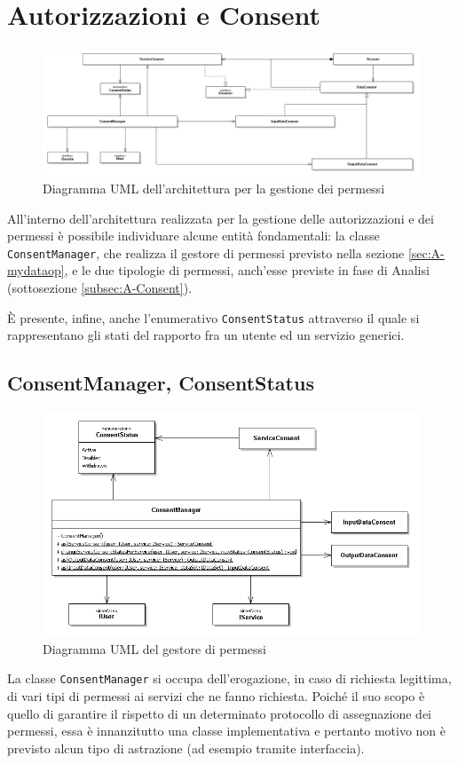 \section{Autorizzazioni e Consent}
\label{sec:P-AutorizzazioniEConsent}
\begin{figure} [h]
\includegraphics[width=\linewidth]{pictures/Auth-closed.png}
\caption{Diagramma UML dell'architettura per la gestione dei permessi}
\label{fig:Auth-closed}
\end{figure}
All'interno dell'architettura realizzata per la gestione delle autorizzazioni e dei permessi \`e possibile individuare alcune entit\`a fondamentali: la classe \texttt{ConsentManager}, che realizza il gestore di permessi previsto nella sezione \ref{sec:A-mydataop}, e le due tipologie di permessi, anch’esse previste in fase di Analisi (sottosezione \ref{subsec:A-Consent}).

\`E presente, infine, anche l’enumerativo \texttt{ConsentStatus} attraverso il quale si rappresentano gli stati del rapporto fra un utente ed un servizio generici.

\subsection{ConsentManager, ConsentStatus}
\label{subsec:P-CMConsStatus}
\begin{figure} [h]
	\includegraphics[width=\linewidth]{pictures/Auth-CM.png}
	\caption{Diagramma UML del gestore di permessi}
	\label{fig:Auth-CM}
\end{figure}
La classe \texttt{ConsentManager} si occupa dell’erogazione, in caso di richiesta legittima, di vari tipi di permessi ai servizi che ne fanno richiesta. Poich\'e il suo scopo \`e quello di garantire il rispetto di un determinato protocollo di assegnazione dei permessi, essa \`e innanzitutto una classe implementativa e pertanto motivo non \`e previsto alcun tipo di astrazione (ad esempio tramite interfaccia).

